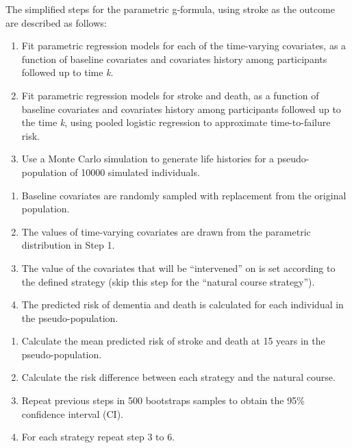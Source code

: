 \documentclass[
]{book}
\begin{document}
The simplified steps for the parametric g-formula, using stroke as the outcome are described as follows:

\begin{enumerate}
\def\labelenumi{\arabic{enumi}.}
\item
  Fit parametric regression models for each of the time-varying covariates, as a function of baseline covariates and covariates history among participants followed up to time \emph{k}.
\item
  Fit parametric regression models for stroke and death, as a function of baseline covariates and covariates history among participants followed up to the time \emph{k}, using pooled logistic regression to approximate time-to-failure risk.
\item
  Use a Monte Carlo simulation to generate life histories for a pseudo-population of 10000 simulated individuals.
\end{enumerate}

\begin{enumerate}
\def\labelenumi{\alph{enumi}.}
\item
  Baseline covariates are randomly sampled with replacement from the original population.
\item
  The values of time-varying covariates are drawn from the parametric distribution in Step 1.
\item
  The value of the covariates that will be ``intervened'' on is set according to the defined strategy (skip this step for the ``natural course strategy'').
\item
  The predicted risk of dementia and death is calculated for each individual in the pseudo-population.
\end{enumerate}

\begin{enumerate}
\def\labelenumi{\arabic{enumi}.}
\setcounter{enumi}{3}
\item
  Calculate the mean predicted risk of stroke and death at 15 years in the pseudo-population.
\item
  Calculate the risk difference between each strategy and the natural course.
\item
  Repeat previous steps in 500 bootstraps samples to obtain the 95\% confidence interval (CI).
\item
  For each strategy repeat step 3 to 6.
\end{enumerate}
\end{document}
